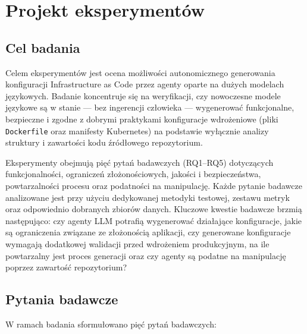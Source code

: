 \clearpage %
\section{Projekt eksperymentów}

\subsection{Cel badania}

Celem eksperymentów jest ocena możliwości autonomicznego generowania konfiguracji Infrastructure as Code przez agenty oparte na dużych modelach językowych. Badanie koncentruje się na weryfikacji, czy nowoczesne modele językowe są w stanie — bez ingerencji człowieka — wygenerować funkcjonalne, bezpieczne i zgodne z dobrymi praktykami konfiguracje wdrożeniowe (pliki \texttt{Dockerfile} oraz manifesty Kubernetes) na podstawie wyłącznie analizy struktury i zawartości kodu źródłowego repozytorium.

Eksperymenty obejmują pięć pytań badawczych (RQ1–RQ5) dotyczących funkcjonalności, ograniczeń złożonościowych, jakości i bezpieczeństwa, powtarzalności procesu oraz podatności na manipulację. Każde pytanie badawcze analizowane jest przy użyciu dedykowanej metodyki testowej, zestawu metryk oraz odpowiednio dobranych zbiorów danych. Kluczowe kwestie badawcze brzmią następująco: czy agenty LLM potrafią wygenerować działające konfiguracje, jakie są ograniczenia związane ze złożonością aplikacji, czy generowane konfiguracje wymagają dodatkowej walidacji przed wdrożeniem produkcyjnym, na ile powtarzalny jest proces generacji oraz czy agenty są podatne na manipulację poprzez zawartość repozytorium?

\subsection{Pytania badawcze}

W ramach badania sformułowano pięć pytań badawczych:

